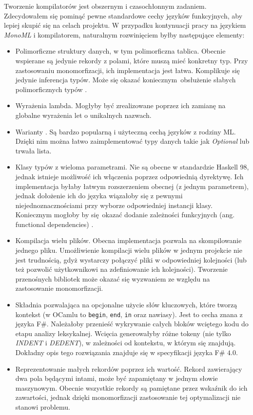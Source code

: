 \documentclass[declaration,shortabstract]{iithesis}
\begin{document}
Tworzenie kompilatorów jest obszernym i czasochłonnym zadaniem. Zdecydowałem 
się pominąć pewne standardowe cechy języków funkcyjnych, aby lepiej skupić 
się na celach projektu. W przypadku kontynuacji pracy na językiem \textit{MonoML}
i kompilatorem, naturalnym rozwinięciem byłby następujące elementy:

\begin{itemize}
  \item Polimorficzne struktury danych, w tym polimorficzna tablica. Obecnie 
  wspierane są jedynie rekordy z polami, które muszą mieć konkretny typ. 
  Przy zastosowaniu monomorfizacji, ich implementacja jest łatwa. Komplikuje
  się jedynie inferencja typów. Może się okazać koniecznym obsłużenie słabych 
  polimorficznych typów \cite{weak_poly_ocaml}.
  \item Wyrażenia lambda. Mogłyby być zrealizowane poprzez ich zamianę na 
  globalne wyrażenia let o unikalnych nazwach. 
  \item Warianty \cite[Chapter 6]{real_ocaml}. Są bardzo popularną i użyteczną cechą 
  języków z rodziny ML. Dzięki nim można łatwo zaimplementować typy danych takie 
  jak \textit{Optional} lub trwała lista.   
  \item Klasy typów z wieloma parametrami. Nie są obecne w standardzie 
  Haskell 98, jednak istnieje możliwość ich włączenia poprzez odpowiednią 
  dyrektywę. Ich implementacja byłaby łatwym 
  rozszerzeniem obecnej (z jednym parametrem), jednak dołożenie ich do języka 
  wiązałoby się z pewnymi niejednoznacznościami \cite{multi_params_tcs}
  przy wyborze odpowiedniej instancji klasy. Koniecznym mogłoby by się okazać 
  dodanie zależności funkcyjnych (ang. functional dependencies) \cite{fun_deps}.
  \item Kompilacja wielu plików. Obecna implementacja pozwala na skompilowanie 
  jednego pliku. Umożliwienie kompilacji wielu plików w jednym projekcie nie 
  jest trudnością, gdyż wystarczy połączyć pliki w odpowiedniej kolejności
  (lub też pozwolić użytkownikowi na zdefiniowanie ich kolejności). Tworzenie 
  przenośnych bibliotek może okazać się wyzwaniem ze względu na zastosowanie 
  monomorfizacji.
  \item Składnia pozwalająca na opcjonalne użycie słów kluczowych, które tworzą 
  kontekst (w OCamlu to \texttt{begin}, \texttt{end}, \texttt{in} oraz nawiasy).
  Jest to cecha znana z języka F\#. Należałoby przenieść wykrywanie 
  całych bloków wciętego kodu do etapu analizy leksykalnej. Wcięcia generowałyby 
  różne tokeny (nie tylko \textit{INDENT} i \textit{DEDENT}), w zależności 
  od kontekstu, w którym się znajdują. Dokładny opis tego rozwiązania znajduje 
  się w specyfikacji języka F\# $4.0$\cite{fs_spec}.
  \item Reprezentowanie małych rekordów poprzez ich wartość. Rekord zawierający 
  dwa pola będącymi intami, może być zapamiętany w jednym słowie maszynowym. 
  Obecnie wszystkie rekordy są pamiętane przez wskaźnik do ich zawartości, 
  jednak dzięki monomorfizacji zastosowanie tej optymalizacji nie stanowi 
  problemu.

\end{itemize}
\end{document}
